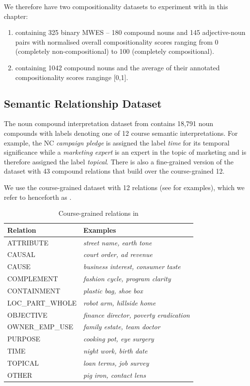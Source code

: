 \noindent
We therefore have two compositionality datasets to experiment with in this chapter:
\begin{enumerate}
    \item \textbf{\comp} containing 325 binary MWES -- 180 compound nouns and 145 adjective-noun pairs with normalised overall compositionality scores ranging from 0 (completely non-compositional) to 100 (completely compositional).
    \item \textbf{\farahm} containing 1042 compound nouns and the average of their annotated compositionality scores ranginge [0,1].
\end{enumerate}

\subsection{Semantic Relationship Dataset}
The noun compound interpretation dataset from \cite{Tratz2010} contains 18,791 noun compounds with labels denoting one of 12 course semantic interpretations. For example, the NC \textit{campaign pledge} is assigned the label \textit{time} for its temporal significance while a \textit{marketing expert} is an expert in the topic of marketing and is therefore assigned the label \textit{topical}. There is also a fine-grained version of the dataset with 43 compound relations that build over the course-grained 12.

We use the course-grained dataset with 12 relations (see  for examples), which we refer to henceforth as \tratz.

\begin{table}[!htb]
\centering
\begin{tabular}{ll}
  \toprule
  Relation &\qquad Examples \\
  \midrule
  ATTRIBUTE &\qquad \textit{street name, earth tone} \\
  CAUSAL &\qquad \textit{court order, ad revenue} \\
  CAUSE &\qquad \textit{business interest, consumer taste} \\
  COMPLEMENT &\qquad \textit{fashion cycle, program clarity} \\
  CONTAINMENT &\qquad \textit{plastic bag, shoe box} \\
  LOC\_PART\_WHOLE &\qquad \textit{robot arm, hillside home} \\
  OBJECTIVE &\qquad \textit{finance director, poverty eradication} \\
  OWNER\_EMP\_USE &\qquad \textit{family estate, team doctor} \\
  PURPOSE &\qquad \textit{cooking pot, eye surgery} \\
  TIME &\qquad \textit{night work, birth date} \\
  TOPICAL &\qquad \textit{loan terms, job survey} \\
   \midrule
  OTHER &\qquad \textit{pig iron, contact lens} \\
\bottomrule
\end{tabular}
\caption{Course-grained relations in \tratz}
\label{tab:relations}
\end{table}

